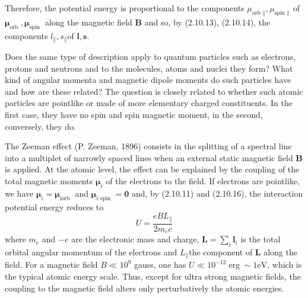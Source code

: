\documentclass{article}
\begin{document}
Therefore, the potential energy is proportional to the components $\mu_{\text {orb } \|}, \mu_{\text {spin } \|}$ of $\boldsymbol{\mu}_{\text {orb }}, \boldsymbol{\mu}_{\text {spin }}$ along the magnetic field $\boldsymbol{B}$ and so, by (2.10.13), (2.10.14), the components $l_{\|}, s_{\|}$of $\boldsymbol{l}, \boldsymbol{s}$.

Does the same type of description apply to quantum particles such as electrons, protons and neutrons and to the molecules, atoms and nuclei they form? What kind of angular momenta and magnetic dipole moments do such particles have and how are these related? The question is closely related to whether such atomic particles are pointlike or made of more elementary charged constituents. In the first case, they have no spin and spin magnetic moment, in the second, conversely, they do.

The Zeeman effect (P. Zeeman, 1896) consists in the splitting of a spectral line into a multiplet of narrowly spaced lines when an external static magnetic field $\boldsymbol{B}$ is applied. At the atomic level, the effect can be explained by the coupling of the total magnetic moments $\boldsymbol{\mu}_{i}$ of the electrons to the field. If electrons are pointlike, we have $\boldsymbol{\mu}_{i}=\boldsymbol{\mu}_{\text {iorb }}$ and $\boldsymbol{\mu}_{i \text { spin }}=\mathbf{0}$ and, by (2.10.11) and (2.10.16), the interaction potential energy reduces to
$$
\begin{equation*}
U=\frac{e B L_{\|}}{2 m_{e} c} \tag{2.10.18}
\end{equation*}
$$
where $m_{e}$ and $-e$ are the electronic mass and charge, $\boldsymbol{L}=\sum_{i} \boldsymbol{l}_{i}$ is the total orbital angular momentum of the electrons and $L_{\|}$the component of $\boldsymbol{L}$ along the field. For a magnetic field $B \ll 10^{9}$ gauss, one has $U \ll 10^{-12} \operatorname{erg} \sim 1 \mathrm{eV}$, which is the typical atomic energy scale. Thus, except for ultra strong magnetic fields, the coupling to the magnetic field alters only perturbatively the atomic energies.
\end{document}
